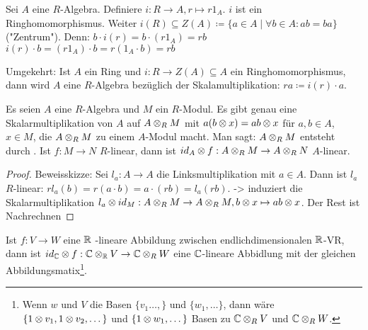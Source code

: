 \documentclass[../main.tex]{subfiles}
\begin{document}
\begin{remark}
    Sei $A$ eine $R$-Algebra. Definiere $i:R\rightarrow A, r\mapsto r1_A$.
    $i$ ist ein Ringhomomorphismus.
    Weiter $i(R)\subseteq Z(A)\coloneqq \{a\in A \mid \forall b \in A: ab = ba\}$ ("Zentrum").
    Denn: $b\cdot i(r) = b \cdot (r1_A) = rb$\\
    $i(r)\cdot b = (r1_A)\cdot b = r(1_A\cdot b) = rb$

    Umgekehrt:
    Ist $A$ ein Ring und $i:R\rightarrow Z(A) \subseteq A$ ein Ringhomomorphismus, dann wird $A$ eine $R$-Algebra bezüglich der Skalamultiplikation: $ra\coloneqq i(r)\cdot a$.
\end{remark}
\begin{theorem}[Skalarerweiterung]
    Es seien $A$ eine $R$-Algebra und $M$ ein $R$-Modul.
    Es gibt genau eine Skalarmultiplikation von $A$ auf $A\otimes_R M$ mit $a(b\otimes x) = ab \otimes x$ für $a,b\in A$, $x\in M$, die $A\otimes_R M$ zu einem $A$-Modul macht.
    Man sagt: $A\otimes_R M$ entsteht durch .
    Ist $f:M\rightarrow N$ $R$-linear, dann ist $id_A \otimes f: A\otimes_R M \rightarrow A\otimes_R N$ $A$-linear.
\end{theorem}
\begin{proof}
    Beweisskizze:
    Sei $l_a:A\rightarrow A$ die Linksmultiplikation mit $a\in A$. Dann ist $l_a$ $R$-linear:
    $rl_a(b) = r(a\cdot b) = a \cdot (rb) = l_a(rb).$
    -> induziert die Skalarmultiplikation $l_a\otimes id_M:A\otimes_R M\rightarrow A\otimes_R M, b\otimes x\mapsto ab\otimes x$.
    Der Rest ist Nachrechnen
\end{proof}
\begin{example}
    Ist $f:V\rightarrow W$ eine $\mathbb{R}$ -lineare Abbildung
    zwischen endlichdimensionalen $\mathbb{R}$-VR, dann ist $id_{\mathbb{C}} \otimes f: \mathbb{C}\otimes_{\mathbb{R}} V \rightarrow \mathbb{C}\otimes_R W$ eine $\mathbb{C}$-lineare Abbidlung mit der gleichen Abbildungsmatix\footnote{Wenn $w$ und $V$ die Basen $\{v_1\dots,\}$ und $\{w_1,\dots\}$, dann wäre $\{1\otimes v_1,1\otimes v_2,\dots\}$ und $\{1\otimes w_1,\dots\}$ Basen zu $\mathbb{C}\otimes_R V$ und $\mathbb{C}\otimes_R W$.}.
\end{example}
\end{document}
